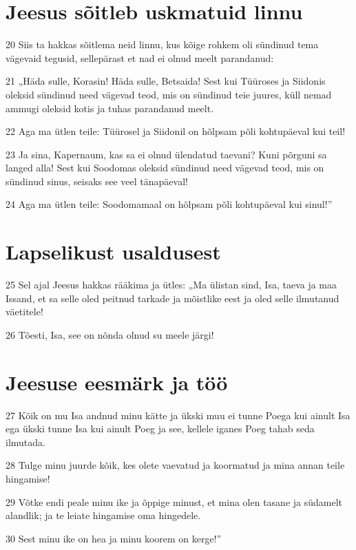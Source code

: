 \section*{Jeesus sõitleb uskmatuid linnu}

\par 20 Siis ta hakkas sõitlema neid linnu, kus kõige rohkem oli sündinud tema vägevaid tegusid, sellepärast et nad ei olnud meelt parandanud:
\par 21 „Häda sulle, Korasin! Häda sulle, Betsaida! Sest kui Tüüroses ja Siidonis oleksid sündinud need vägevad teod, mis on sündinud teie juures, küll nemad ammugi oleksid kotis ja tuhas parandanud meelt.
\par 22 Aga ma ütlen teile: Tüürosel ja Siidonil on hõlpsam põli kohtupäeval kui teil!
\par 23 Ja sina, Kapernaum, kas sa ei olnud ülendatud taevani? Kuni põrguni sa langed alla! Sest kui Soodomas oleksid sündinud need vägevad teod, mis on sündinud sinus, seisaks see veel tänapäeval!
\par 24 Aga ma ütlen teile: Soodomamaal on hõlpsam põli kohtupäeval kui sinul!”

\section*{Lapselikust usaldusest}

\par 25 Sel ajal Jeesus hakkas rääkima ja ütles: „Ma ülistan sind, Isa, taeva ja maa Issand, et sa selle oled peitnud tarkade ja mõistlike eest ja oled selle ilmutanud väetitele!
\par 26 Tõesti, Isa, see on nõnda olnud su meele järgi!

\section*{Jeesuse eesmärk ja töö}

\par 27 Kõik on mu Isa andnud minu kätte ja ükski muu ei tunne Poega kui ainult Isa ega ükski tunne Isa kui ainult Poeg ja see, kellele iganes Poeg tahab seda ilmutada.
\par 28 Tulge minu juurde kõik, kes olete vaevatud ja koormatud ja mina annan teile hingamise!
\par 29 Võtke endi peale minu ike ja õppige minust, et mina olen tasane ja südamelt alandlik; ja te leiate hingamise oma hingedele.
\par 30 Sest minu ike on hea ja minu koorem on kerge!”


